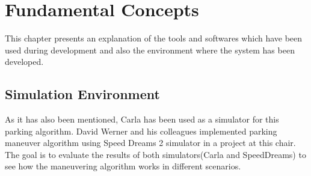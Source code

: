 \chapter{Fundamental Concepts}\label{chapter:Background}
This chapter presents an explanation of the tools and softwares which have been used during development and also the environment where the system has been developed. 
\section{Simulation Environment}
As it has also been mentioned, Carla has been used as a simulator for this parking algorithm. David Werner and his colleagues \cite{parkingSimulation_IDP} implemented parking maneuver algorithm using Speed Dreams 2 simulator in a project at this chair. The goal is to evaluate the results of both simulators(Carla and SpeedDreams) to see how the maneuvering algorithm works in different scenarios.
